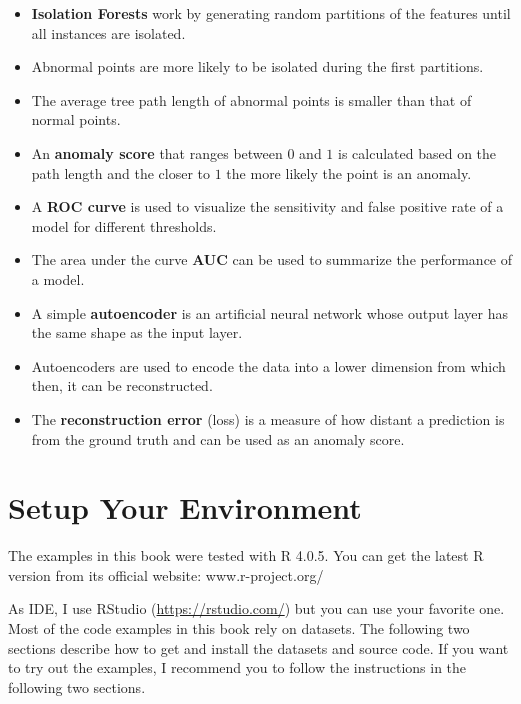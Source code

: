 \documentclass[
  11pt,
]{krantz}
\providecommand{\tightlist}{%
  \setlength{\itemsep}{0pt}\setlength{\parskip}{0pt}}
\begin{document}
\begin{itemize}
\tightlist
\item
  \textbf{Isolation Forests} work by generating random partitions of the features until all instances are isolated.
\item
  Abnormal points are more likely to be isolated during the first partitions.
\item
  The average tree path length of abnormal points is smaller than that of normal points.
\item
  An \textbf{anomaly score} that ranges between \(0\) and \(1\) is calculated based on the path length and the closer to \(1\) the more likely the point is an anomaly.
\item
  A \textbf{ROC curve} is used to visualize the sensitivity and false positive rate of a model for different thresholds.
\item
  The area under the curve \textbf{AUC} can be used to summarize the performance of a model.
\item
  A simple \textbf{autoencoder} is an artificial neural network whose output layer has the same shape as the input layer.
\item
  Autoencoders are used to encode the data into a lower dimension from which then, it can be reconstructed.
\item
  The \textbf{reconstruction error} (loss) is a measure of how distant a prediction is from the ground truth and can be used as an anomaly score.
\end{itemize}



\cleardoublepage

\appendix

\hypertarget{appendixInstall}{%
\chapter{Setup Your Environment}\label{appendixInstall}}

The examples in this book were tested with R 4.0.5. You can get the latest R version from its official website: www.r-project.org/

As IDE, I use RStudio (\url{https://rstudio.com/}) but you can use your favorite one. Most of the code examples in this book rely on datasets. The following two sections describe how to get and install the datasets and source code. If you want to try out the examples, I recommend you to follow the instructions in the following two sections.
\end{document}
